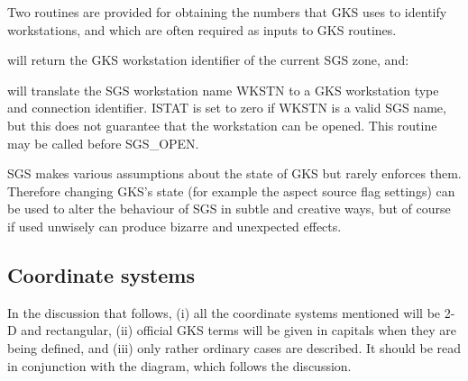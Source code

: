 \documentclass[11pt]{starlink}
\begin{document}
Two routines are provided for obtaining the numbers that GKS uses to identify
workstations, and which are often required as inputs to GKS routines.
\begin{terminalv}
CALL SGS_ICURW (IWKID)}
\end{terminalv}
will return the GKS workstation identifier of the current SGS zone, and:
\begin{terminalv}
CALL SGS_WIDEN (WKSTN,ITYPE,ICONID,ISTAT)}
\end{terminalv}
will translate the SGS workstation name WKSTN to a GKS workstation type and
connection identifier.
ISTAT is set to zero if WKSTN is a valid SGS name, but this does not guarantee
that the workstation can be opened.
This routine may be called before SGS\_OPEN.

SGS makes various assumptions about the state of GKS but rarely enforces them.
Therefore changing GKS's state (for example the aspect source flag settings)
can be used to alter the behaviour of SGS in subtle and creative ways, but of
course if used unwisely can produce bizarre and unexpected effects.

\subsection* {Coordinate systems}\label{app-coordinates}

In the discussion that follows, (i) all the coordinate systems
mentioned will be 2-D and rectangular, (ii) official
GKS terms will be given in capitals when they are being
defined, and (iii) only rather ordinary cases are described.  It
should be read in conjunction with the diagram, which follows the
discussion.
\end{document}
